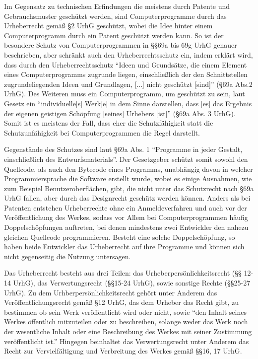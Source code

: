Im Gegensatz zu technischen Erfindungen die meistens durch Patente und Gebrauchsmuster geschützt werden, sind Computerprogramme durch das Urheberrecht gemäß §2 UrhG geschützt,
wobei die Idee hinter einem Computerprogramm durch ein Patent geschützt werden kann. So ist der besondere Schutz von Computerprogrammen in §§69a bis 69g UrhG genauer beschrieben,
aber schränkt auch den Urheberrechtsschutz ein, indem erklärt wird, dass durch den Urheberrechtsschutz “Ideen und Grundsätze, die einem Element eines Computerprogramms zugrunde liegen, einschließlich der den Schnittstellen zugrundeliegenden Ideen und Grundlagen,
[...] nicht geschützt [sind]” (§69a Abs.2 UrhG).  Des Weiteren muss ein Computerprogramm, um geschützt zu sein, laut Gesetz ein “individuelle[s] Werk[e] in dem Sinne darstellen,
dass [es] das Ergebnis der eigenen geistigen Schöpfung [seines] Urhebers [ist]” (§69a Abs. 3 UrhG). Somit ist es meistens der Fall, dass eher die Schutzfähigkeit statt die Schutzunfähigkeit bei Computerprogrammen die Regel darstellt.

Gegenstände des Schutzes sind laut §69a Abs. 1 “Programme in jeder Gestalt, einschließlich des Entwurfsmaterials”. Der Gesetzgeber schützt somit sowohl den Quellcode,
als auch den Bytecode eines Programms, unabhängig davon in welcher Programmiersprache die Software erstellt wurde, wobei es einige Ausnahmen, wie zum Beispiel Benutzeroberflächen, gibt,
die nicht unter das Schutzrecht nach §69a UrhG fallen, aber durch das Designrecht geschütz werden können. Anders als bei Patenten entstehen Urheberrechte ohne ein Anmeldeverfahren und auch vor der Veröffentlichung des Werkes,
sodass vor Allem bei Computerprogrammen häufig Doppelschöpfungen auftreten, bei denen mindestens zwei Entwickler den nahezu gleichen Quellcode programmieren.
Besteht eine solche Doppelschöpfung, so haben beide Entwickler das Urheberrecht auf ihre Programme und können sich nicht gegenseitig die Nutzung untersagen. 

Das Urheberrecht besteht aus drei Teilen: das Urheberpersönlichkeitsrecht (§§ 12-14 UrhG), das Verwertungsrecht (§§15-24 UrhG), sowie sonstige Rechte (§§25-27 UrhG).
Zu dem Urhberpersönlichkeitsrecht gehört unter Anderem das Veröffentlichungsrecht gemäß §12 UrhG, das dem Urheber das Recht gibt, zu bestimmen ob sein Werk veröffentlicht wird oder nicht,
sowie “den Inhalt seines Werkes öffentlich mitzuteilen oder zu beschreiben, solange weder das Werk noch der wesentliche Inhalt oder eine Beschreibung des Werkes mit seiner
Zustimmung veröffentlicht ist.” Hingegen beinhaltet das Verwertungsrecht unter Anderem das Recht zur Vervielfältigung und Verbreitung des Werkes gemäß §§16, 17 UrhG.


